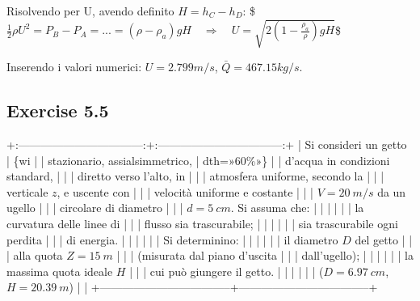 \documentclass[letterpaper,10pt,italian]{jupyterBook}
\begin{document}
\sphinxAtStartPar
Risolvendo per U, avendo definito \(H = h_C - h_D\):
\$\(\frac{1}{2} \rho U^2 = P_B - P_A = ... = (\rho - \rho_a) g H \quad \Rightarrow \quad 
  U = \sqrt{2\displaystyle\left(1-\frac{\rho_a}{\rho}\right) g H}\)\$

\sphinxAtStartPar
Inserendo i valori numerici: \(U = 2.799 m/s\), \(\bar{Q} = 467.15 kg/s\).

\sphinxstepscope


\subsection{Exercise 5.5}
\label{\detokenize{polimi/fluidmechanics-ita/template/capitoli/05_bernoulli/0506in:exercise-5-5}}\label{\detokenize{polimi/fluidmechanics-ita/template/capitoli/05_bernoulli/0506in:fluid-mechanics-bernoulli-ex-05}}\label{\detokenize{polimi/fluidmechanics-ita/template/capitoli/05_bernoulli/0506in::doc}}
\sphinxAtStartPar
+:———————————:+:———————————:+
| Si consideri un getto             | \{wi |
| stazionario, assialsimmetrico,    | dth=»60\%»\}                        |
| d’acqua in condizioni standard,   |                                   |
| diretto verso l’alto, in          |                                   |
| atmosfera uniforme, secondo la    |                                   |
| verticale \(z\), e uscente con      |                                   |
| velocità uniforme e costante      |                                   |
| \(V = 20\ m/s\) da un ugello        |                                   |
| circolare di diametro             |                                   |
| \(d = 5\  cm\). Si assuma che:      |                                   |
|                                   |                                   |
| \sphinxhyphen{}   la curvatura delle linee di   |                                   |
|     flusso sia trascurabile;      |                                   |
|                                   |                                   |
| \sphinxhyphen{}   sia trascurabile ogni perdita |                                   |
|     di energia.                   |                                   |
|                                   |                                   |
| Si determinino:                   |                                   |
|                                   |                                   |
| \sphinxhyphen{}   il diametro \(D\) del getto     |                                   |
|     alla quota \(Z = 15\ m\)        |                                   |
|     (misurata dal piano d’uscita  |                                   |
|     dall’ugello);                 |                                   |
|                                   |                                   |
| \sphinxhyphen{}   la massima quota ideale \(H\)   |                                   |
|     cui può giungere il getto.    |                                   |
|                                   |                                   |
| (\(D = 6.97\ cm\), \(H = 20.39\  m\)) |                                   |
+———————————–+———————————–+
\end{document}
